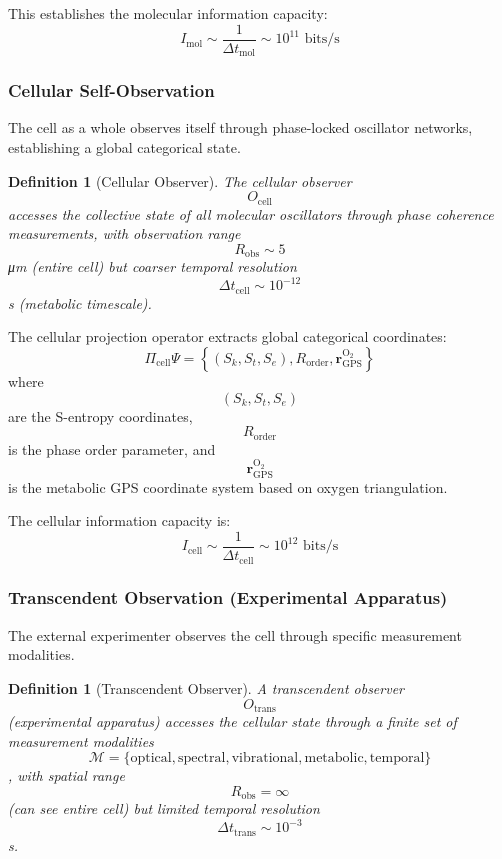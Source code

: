 \documentclass[11pt,twocolumn,a4paper]{article}
\newtheorem{definition}[theorem]{Definition}
\theoremstyle{remark}
\begin{document}
This establishes the molecular information capacity:
$$
I_{\mathrm{mol}} \sim \frac{1}{\Delta t_{\mathrm{mol}}} \sim 10^{11} \text{ bits/s}
$$

\subsubsection{Cellular Self-Observation}

The cell as a whole observes itself through phase-locked oscillator networks, establishing a global categorical state.

\begin{definition}[Cellular Observer]
\label{def:cellular_observer}
The cellular observer $$O_{\mathrm{cell}}$$ accesses the collective state of all molecular oscillators through phase coherence measurements, with observation range $$R_{\mathrm{obs}} \sim 5$$ μm (entire cell) but coarser temporal resolution $$\Delta t_{\mathrm{cell}} \sim 10^{-12}$$ s (metabolic timescale).
\end{definition}

The cellular projection operator extracts global categorical coordinates:
$$
\Pi_{\mathrm{cell}} \Psi = \left\{ (S_k, S_t, S_e), R_{\mathrm{order}}, \mathbf{r}_{\mathrm{GPS}}^{\mathrm{O}_2} \right\}
$$
where $$(S_k, S_t, S_e)$$ are the S-entropy coordinates, $$R_{\mathrm{order}}$$ is the phase order parameter, and $$\mathbf{r}_{\mathrm{GPS}}^{\mathrm{O}_2}$$ is the metabolic GPS coordinate system based on oxygen triangulation.

The cellular information capacity is:
$$
I_{\mathrm{cell}} \sim \frac{1}{\Delta t_{\mathrm{cell}}} \sim 10^{12} \text{ bits/s}
$$

\subsubsection{Transcendent Observation (Experimental Apparatus)}

The external experimenter observes the cell through specific measurement modalities.

\begin{definition}[Transcendent Observer]
\label{def:transcendent_observer}
A transcendent observer $$O_{\mathrm{trans}}$$ (experimental apparatus) accesses the cellular state through a finite set of measurement modalities $$\mathcal{M} = \{\text{optical}, \text{spectral}, \text{vibrational}, \text{metabolic}, \text{temporal}\}$$, with spatial range $$R_{\mathrm{obs}} = \infty$$ (can see entire cell) but limited temporal resolution $$\Delta t_{\mathrm{trans}} \sim 10^{-3}$$ s.
\end{definition}
\end{document}
